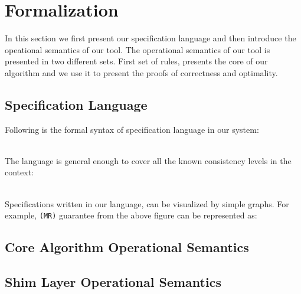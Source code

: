 \section{Formalization}
In this section we first present our specification language and then
introduce the opeational semantics of our tool. The operational semantics of our tool is presented in two different sets. First set of rules, presents the core of our algorithm and we use it to present the proofs of correctness and optimality. 

\subsection{Specification Language}
Following is the formal syntax of specification language in our system:

\\ The language is general enough to cover all  the known consistency
levels in the context:

\\ Specifications written in our language, can be visualized by simple graphs. For example, \texttt{(MR)} guarantee from the above figure can be represented as:



\subsection{Core Algorithm Operational Semantics}



\subsection {Shim Layer Operational Semantics}



